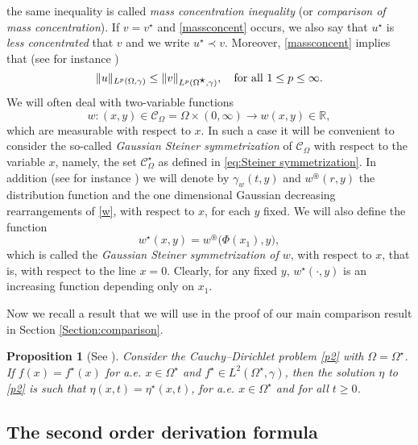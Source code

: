 \documentclass[a4paper,10pt,reqno]{amsart}
\newtheorem{proposition}[theorem]{Proposition}
\numberwithin{equation}{section}
\begin{document}
the same inequality is called \emph{mass concentration inequality} (or \emph{comparison of mass concentration}). If $v=v^{\displaystyle\star}$ and
\eqref{massconcent} occurs, we also say that $u^{\displaystyle\star}$ is \emph{less concentrated} that $v$ and we write $u^{\displaystyle\star}\prec v$.
Moreover, \eqref{massconcent} implies that (see for instance \cite{Chong})
\[
\|u\|_{L^{p}(\Omega,\gamma)}\leq \|v\|_{L^{p}(\Omega^{\displaystyle\star},\gamma)},
\quad\hbox{for all}~1\leq p\leq\infty.
\]
We will often deal with two-variable functions
\begin{equation}\label{w}%
w:(x,y)\in\mathcal{C}_{\Omega}=\Omega\times(0,\infty)\rightarrow w(x,y)\in{\mathbb{R}},
\end{equation}
which are measurable with respect to $x$.
In such a case it will be convenient to consider the
so-called \textit{Gaussian Steiner symmetrization} of $\mathcal{C}_{\Omega}$ with
respect to the variable $x$, namely, the set $\mathcal{C}_{\Omega}^{\displaystyle\star}$
as defined in \eqref{eq:Steiner symmetrization}.
In addition (see for instance \cite{chiacchio,Eh2}) we will denote by $\gamma_{w}(t,y)$
and $w^{\circledast}(r,y)$ the distribution
function and the one dimensional Gaussian decreasing rearrangements of \eqref{w}, with respect to $x$,
for each $y$ fixed. We will also define the function
$$w^{\displaystyle\star}(x,y)=w^{\circledast}\big(\Phi(x_{1}),y\big),$$
which is called the \emph{Gaussian Steiner symmetrization of $w$}, with respect to $x$, that is, with respect to the line $x=0$.
Clearly, for any fixed $y$, $w^{\displaystyle\star}(\cdot,y)$ is an increasing function depending only on $x_{1}$.

Now we recall a result that we will use in the proof of our main comparison result in Section
\ref{Section:comparison}.

\begin{proposition}[See {\cite[p.~255]{chiacchio}}]\label{prop chiacchio}
Consider the Cauchy--Dirichlet problem \eqref{p2} with $\Omega=\Omega^{\displaystyle\star}$.
If $f(x)=f^{\displaystyle\star}(x)$ for a.e. $x \in \Omega^{\displaystyle\star}$ and
$f^{\displaystyle\star}\in L^{2}(\Omega^{\displaystyle\star},\gamma)$, then the solution $\eta$ to
\eqref{p2} is such that $\eta(x,t)=\eta^{\displaystyle\star}(x,t)$, for a.e. $x\in\Omega^{\displaystyle\star}$
and for all $t\geq0$.
\end{proposition}

\subsection{The second order derivation formula}
\end{document}
